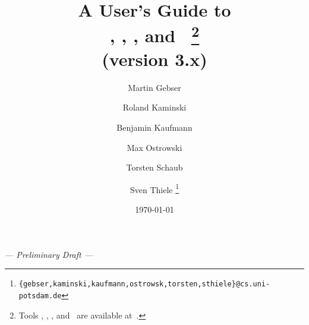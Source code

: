 \documentclass[a4paper,10pt]{article}
\author{%
Martin Gebser \and 
Roland Kaminski \and  
	Benjamin Kaufmann \and 
Max Ostrowski \and  
Torsten Schaub \and  
Sven Thiele
  \thanks{\texttt{\{gebser,kaminski,kaufmann,ostrowsk,torsten,sthiele\}@cs.uni-potsdam.de}}}
\title{%
	\bf A User's Guide to\\
	\gringo, \clasp, \clingo, and \iclingo\
	\thanks{Tools \gringo, \clasp, \clingo, and \iclingo\ are available at~\cite{potassco}.} \\[0.0cm]
	{\normalsize \textnormal{(version 3.x)}}
}
\date{\today}
\begin{document}
\maketitle

{\hfill\large\it --- Preliminary Draft ---\hfill}



\newpage
\tableofcontents
\listoffigures
\lstlistoflistings
\newpage









\newpage
{}
{}



\appendix

%


\printindex
\end{document}
